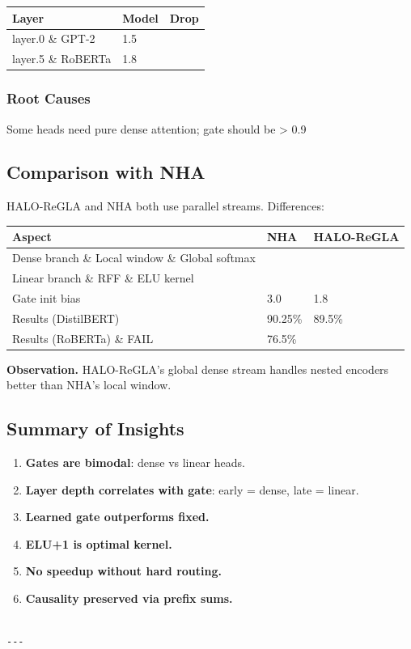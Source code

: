 \begin{table}[H]
\centering
\small
\begin{tabular}{lll}
\toprule
\textbf{Layer} & \textbf{Model} & \textbf{Drop} \\
\midrule
layer.0 \& GPT-2 & 1.5 \\
layer.5 \& RoBERTa & 1.8 \\
\bottomrule
\end{tabular}
\end{table}

\subsubsection{Root Causes}

Some heads need pure dense attention; gate should be > 0.9

\subsection{Comparison with NHA}

HALO-ReGLA and NHA both use parallel streams. Differences:

\begin{table}[H]
\centering
\small
\begin{tabular}{lll}
\toprule
\textbf{Aspect} & \textbf{NHA} & \textbf{HALO-ReGLA} \\
\midrule
Dense branch \& Local window \& Global softmax \\
Linear branch \& RFF \& ELU kernel \\
Gate init bias & 3.0 & 1.8 \\
Results (DistilBERT) & 90.25\% & 89.5\% \\
Results (RoBERTa) \& FAIL & 76.5\% \\
\bottomrule
\end{tabular}
\end{table}

\textbf{Observation.} HALO-ReGLA's global dense stream handles nested encoders 
better than NHA's local window.

\subsection{Summary of Insights}

\begin{enumerate}
\item \textbf{Gates are bimodal}: dense vs linear heads.
\item \textbf{Layer depth correlates with gate}: early = dense, late = linear.
\item \textbf{Learned gate outperforms fixed.}
\item \textbf{ELU+1 is optimal kernel.}
\item \textbf{No speedup without hard routing.}
\item \textbf{Causality preserved via prefix sums.}
\end{enumerate}
\begin{lstlisting}

---
\end{lstlisting}
